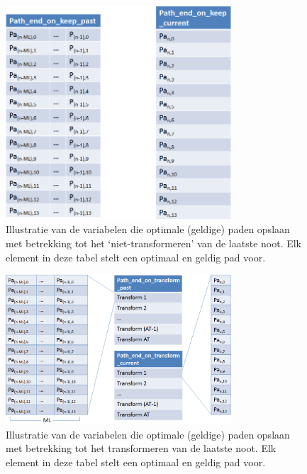 \begin{figure}[!ht]
  \centering
  \includegraphics[width=0.75\textwidth]{4_Efficient_Toepassen_Transformatie/path_keep_algo_2}
  \caption{Illustratie van de variabelen die optimale (geldige) paden opslaan met betrekking tot het `niet-transformeren' van de laatste noot. Elk element in deze tabel stelt een optimaal en geldig pad voor.}
  \label{figuur:path_keep_algo_2}
\end{figure}

\begin{figure}[!ht]
  \centering
  \includegraphics[width=0.75\textwidth]{4_Efficient_Toepassen_Transformatie/path_transform_algo_2}
  \caption{Illustratie van de variabelen die optimale (geldige) paden opslaan met betrekking tot het transformeren van de laatste noot. Elk element in deze tabel stelt een optimaal en geldig pad voor.}
  \label{figuur:path_transform_algo_2}
\end{figure}

